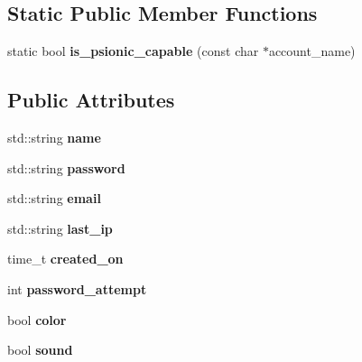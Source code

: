 \subsection*{Static Public Member Functions}
\begin{DoxyCompactItemize}
\item 
\hypertarget{classaccount_a794e867a84315ec47bbc948e5b89c4c2}{static bool {\bfseries is\-\_\-psionic\-\_\-capable} (const char $\ast$account\-\_\-name)}\label{classaccount_a794e867a84315ec47bbc948e5b89c4c2}

\end{DoxyCompactItemize}
\subsection*{Public Attributes}
\begin{DoxyCompactItemize}
\item 
\hypertarget{classaccount_a783452af8647af9c866fc34500d7f3bf}{std\-::string {\bfseries name}}\label{classaccount_a783452af8647af9c866fc34500d7f3bf}

\item 
\hypertarget{classaccount_a5065b11fa126577408a795baaee55c9a}{std\-::string {\bfseries password}}\label{classaccount_a5065b11fa126577408a795baaee55c9a}

\item 
\hypertarget{classaccount_a4162d542188272c7b0d8fa23f3cd1d8d}{std\-::string {\bfseries email}}\label{classaccount_a4162d542188272c7b0d8fa23f3cd1d8d}

\item 
\hypertarget{classaccount_ae3e0f8aeca928fac0382524f6aecd23d}{std\-::string {\bfseries last\-\_\-ip}}\label{classaccount_ae3e0f8aeca928fac0382524f6aecd23d}

\item 
\hypertarget{classaccount_a417252386b992dd5fb40e89c03da57c8}{time\-\_\-t {\bfseries created\-\_\-on}}\label{classaccount_a417252386b992dd5fb40e89c03da57c8}

\item 
\hypertarget{classaccount_af922bcf652c2840a54d1d2fbb2bb2f31}{int {\bfseries password\-\_\-attempt}}\label{classaccount_af922bcf652c2840a54d1d2fbb2bb2f31}

\item 
\hypertarget{classaccount_afcc62d878922a73bb9b4207682ee9308}{bool {\bfseries color}}\label{classaccount_afcc62d878922a73bb9b4207682ee9308}

\item 
\hypertarget{classaccount_abfa6841eb5aa7765512ce8ca2e15c2d5}{bool {\bfseries sound}}\label{classaccount_abfa6841eb5aa7765512ce8ca2e15c2d5}


\end{DoxyCompactItemize}
